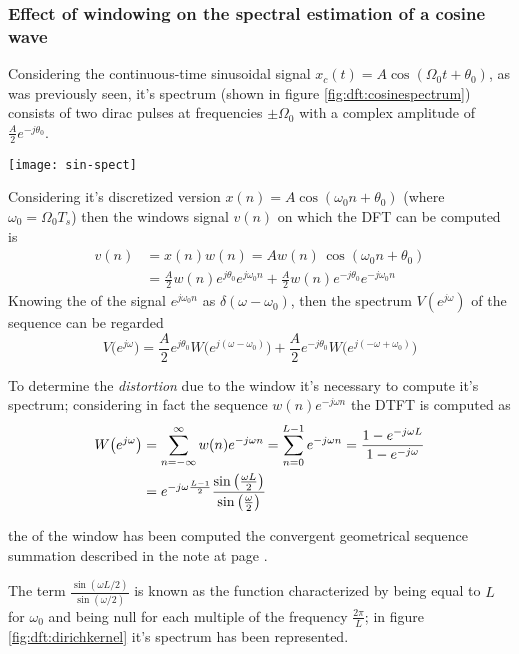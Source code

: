 		\subsubsection{Effect of windowing on the spectral estimation of a cosine wave} Considering the continuous-time sinusoidal signal $x_c(t) = A \cos(\Omega_0 t +\theta_0)$, as was previously seen, it's spectrum (shown in figure \ref{fig:dft:cosinespectrum}) consists of two dirac pulses at frequencies $\pm \Omega_0$ with a complex amplitude of $\frac A 2 e^{-j\theta_0}$.
		
		\begin{SCfigure}[2][bht]
			\centering \texttt{[image: sin-spect]}
			\caption{magnitude spectrum of the signal $A \cos(\Omega_0t+\theta_0)$.}
			\label{fig:dft:cosinespectrum}
		\end{SCfigure}
		
		Considering it's discretized version $x(n) = A\cos(\omega_0n + \theta_0)$ (where $\omega_0 = \Omega_0 T_s$) then the windows signal $v(n)$ on which the DFT can be computed is
		\begin{align*}
			v(n) & = x(n) w(n) = A w(n)\, \cos(\omega_0n + \theta_0) \\
			& = \frac A 2 w(n) e^{j\theta_0} e^{j\omega_0n} + \frac A 2 w(n) e^{-j\theta_0} e^{-j\omega_0n} 
		\end{align*}
		Knowing the \dtft of the signal $e^{j\omega_0n}$ as $\delta(\omega-\omega_0)$, then the spectrum $V(e^{j\omega})$ of the sequence can be regarded
		\begin{equation} \label{eq:dft:windowedcosine}
			V \big(e^{j\omega}\big) = \frac A 2 e^{j\theta_0} W\big( e^{j(\omega-\omega_0)}\big) +  \frac A 2 e^{-j\theta_0} W\big( e^{j(-\omega+ \omega_0)}\big)
		\end{equation}
		
		To determine the \textit{distortion} due to the window it's necessary to compute it's spectrum; considering in fact the sequence $w(n) e^{-j\omega n}$ the DTFT is computed as
		\begin{align*}
			W\big(e^{j\omega}\big) & = \sum_{n=-\infty}^\infty w(n) e^{-j\omega n} = \sum_{n=0}^{L-1} e^{-j\omega n} = \frac{1-e^{-j\omega L}}{1-e^{-j\omega}} \\
			& = e^{-j\omega \frac{L-1}{2}} \frac{\sin\left(\frac{\omega L}{2}\right)}{\sin\left(\frac \omega 2\right)}
		\end{align*}
		\begin{note}
			the \dtft  of the window has been computed the convergent geometrical sequence summation described in the note at page \pageref{sec:four:geometricalprogression}.
		\end{note}
		The term $\frac{\sin(\omega L/2)}{\sin(\omega/2)}$ is known as the  function characterized by being equal to $L$ for $\omega_0$ and being null for each multiple of the frequency $\frac{2\pi}{L}$; in figure \ref{fig:dft:dirichkernel} it's spectrum has been represented.
		
